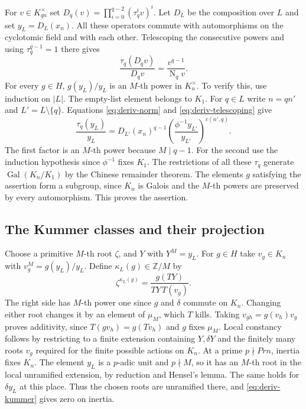 For \(v\in K_{qn}^\times\) set
\(D_q(v)=\prod_{i=0}^{q-2}(\tau_q^iv)^i\). Let \(D_L\) be the
composition over \(L\) and set \(y_L=D_L(x_n)\). All these
operators commute with automorphisms on the cyclotomic field
and with each other. Telescoping the consecutive powers and using
\(\tau_q^{q-1}=1\) there gives
\begin{equation}
 \frac{\tau_q(D_q v)}{D_q v}
       =\frac{v^{q-1}}{\operatorname N_q v}.
 \label{eq:deriv-telescoping}
\end{equation}
For every \(g\in H\), \(g(y_L)/y_L\) is an \(M\)-th power in
\(K_n^\times\). To verify this, use induction on \(|L|\).
The empty-list element belongs to \(K_1\). For \(q\in L\) write
\(n=qn'\) and \(L'=L\setminus\{q\}\). Equations \eqref{eq:deriv-norm} and \eqref{eq:deriv-telescoping} give
\[
 \frac{\tau_q(y_L)}{y_L}
  =D_{L'}(x_n)^{q-1}
       \left(\frac{\phi^{-1}y_{L'}}{y_{L'}}\right)^{c(n',q)} .
\]
The first factor is an \(M\)-th power because \(M\mid q-1\).
For the second use the induction hypothesis since \(\phi^{-1}\)
fixes \(K_1\). The restrictions of all these \(\tau_q\) generate
\(\operatorname{Gal}(K_n/K_1)\) by the Chinese remainder theorem.
The elements \(g\) satisfying the assertion form a subgroup, since
\(K_n\) is Galois and the \(M\)-th powers are preserved by every
automorphism. This proves the assertion.

\subsection{The Kummer classes and their projection}

Choose a primitive \(M\)-th root \(\zeta\), and \(Y\) with \(Y^M=y_L\).
For \(g\in H\) take \(v_g\in K_n\) with \(v_g^M=g(y_L)/y_L\).
Define \(\kappa_L(g)\in\mathbb Z/M\) by
\begin{equation}
 \zeta^{\kappa_L(g)}
       =\frac{g(TY)}{TY\,T(v_g)} .
 \label{eq:deriv-kummer}
\end{equation}
The right side has \(M\)-th power one since \(g\) and \(\delta\)
commute on \(K_n\). Changing either root changes it by an element of
\(\mu_M\), which \(T\) kills. Taking
\(v_{gh}=g(v_h)v_g\) proves additivity, since \(T(gv_h)=g(Tv_h)\)
and \(g\) fixes \(\mu_M\). Local constancy follows by restricting to
a finite extension containing \(Y,\delta Y\) and the finitely many
roots \(v_g\) required for the finite possible actions on \(K_n\).
At a prime \(p\nmid Prn\), inertia fixes \(K_n\). The element \(y_L\)
is a \(p\)-adic unit and \(p\nmid M\), so it has an \(M\)-th root
in the local unramified extension, by reduction and Hensel's lemma.
The same holds for \(\delta y_L\) at this place. Thus the chosen
roots are unramified there, and \eqref{eq:deriv-kummer} gives zero on inertia.

